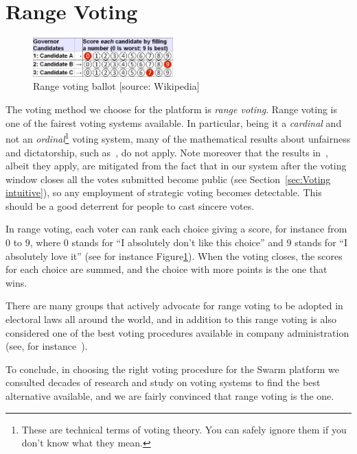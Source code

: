 \documentclass[submission, copyright,creativecommons,sharealike,noncommercial]{eptcs}
\begin{document}
\section{Range Voting}\label{sec:Range voting}
	\begin{figure}
		\vspace{-10pt}
		\begin{center}
			\includegraphics[width=0.48\textwidth]{Voting_Ballot.png}
		\end{center}
		\vspace{-15pt}
		\caption{Range voting ballot [source: Wikipedia]}\label{fig:Ballot}
		\vspace{-5pt}
	\end{figure}
%
	The voting method we choose for the platform is \emph{range voting}. Range voting is one of the fairest voting systems available. In particular, being it a \emph{cardinal} and not an \emph{ordinal}\footnote{These are technical terms of voting theory. You can safely ignore them if you don't know what they mean.} voting system, many of the mathematical results about unfairness and dictatorship, such as~\cite{Arrow1951, Satterthwaite1975}, do not apply. Note moreover that the results in~\cite{Gibbard1973}, albeit they apply, are mitigated from the fact that in our system after the voting window closes all the votes submitted become public (see Section~\ref{sec:Voting intuitive}), so any employment of strategic voting becomes detectable. This should be a good deterrent for people to cast sincere votes.
	
	In range voting, each voter can rank each choice giving a score, for instance from $0$ to $9$, where $0$ stands for ``I absolutely don't like this choice'' and $9$ stands for ``I absolutely love it'' (see for instance Figure\ref{fig:Ballot}). When the voting closes, the scores for each choice are summed, and the choice with more points is the one that wins.
	
	There are many groups that actively advocate for range voting to be adopted in electoral laws all around the world, and in addition to this range voting is also considered one of the best voting procedures available in company administration (see, for instance~\cite{Electology, RangeVoting}). 
	
	To conclude, in choosing the right voting procedure for the Swarm platform we consulted decades of research and study on voting systems to find the best alternative available, and we are fairly convinced that range voting is the one.
%
%	
\end{document}
